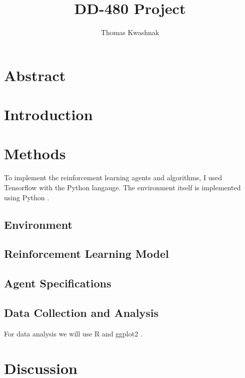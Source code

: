 \documentclass[12pt]{article}
\author{Thomas Kwashnak}
\title{DD-480 Project}
\begin{document}
\maketitle

\newpage

\section{Abstract}

\section{Introduction}

\section{Methods}

To implement the reinforcement learning agents and algorithms, I used Tensorflow \cite{lib_tensorflow} with the Python \cite{lang_python} langauge.
The environment itself is implemented using Python \cite{lang_python}.

\subsection{Environment}

\subsection{Reinforcement Learning Model}

\subsection{Agent Specifications}

\subsection{Data Collection and Analysis}

For data analysis we will use R \cite{lang_r} and ggplot2 \cite{lib_ggplot2}.



\section{Discussion}

\newpage


\end{document}
